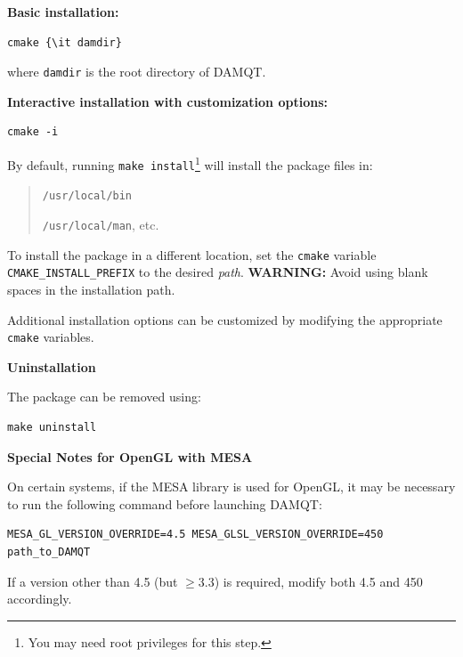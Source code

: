 \documentclass[10pt]{article}
\begin{document}
\begin{itemize}
\item {\bf Basic installation:}

\begin{verbatim}
cmake {\it damdir}
\end{verbatim}
%
where \texttt{damdir} is the root directory of DAMQT.

\item {\bf Interactive installation with customization options:}

\begin{verbatim}
cmake -i
\end{verbatim}

By default, running \texttt{make install}\footnote{You may need root privileges for this step.} will install the package files in:
\vspace*{-5mm}
\begin{quote}
\item \texttt{/usr/local/bin}
\item \texttt{/usr/local/man}, etc.
\end{quote}

To install the package in a different location, set the \texttt{cmake} variable \texttt{CMAKE\_INSTALL\_PREFIX} to the desired {\it path}.
{\bf WARNING:} Avoid using blank spaces in the installation path.

Additional installation options can be customized by modifying the appropriate \texttt{cmake} variables.

\item {\bf Uninstallation}

The package can be removed using:

\begin{verbatim}
make uninstall
\end{verbatim}

\item {\bf Special Notes for OpenGL with MESA}


On certain systems, if the MESA library is used for OpenGL,
it may be necessary to run the following command before launching DAMQT:

\begin{verbatim}
MESA_GL_VERSION_OVERRIDE=4.5 MESA_GLSL_VERSION_OVERRIDE=450 path_to_DAMQT
\end{verbatim}

If a version other than 4.5 (but $\ge 3.3$) is required, modify both 4.5 and 450 accordingly.

\end{itemize}
\end{document}
